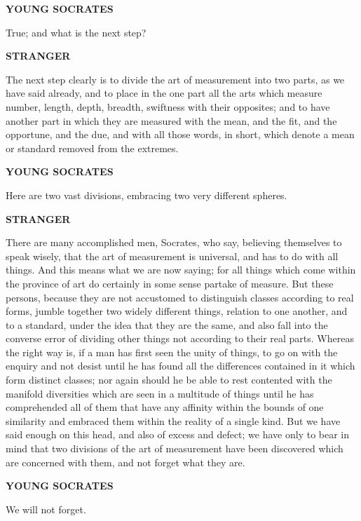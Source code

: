 \documentclass[11pt,letter]{article}
\begin{document}
\par \textbf{YOUNG SOCRATES}
\par   True; and what is the next step?

\par \textbf{STRANGER}
\par   The next step clearly is to divide the art of measurement into two parts, as we have said already, and to place in the one part all the arts which measure number, length, depth, breadth, swiftness with their opposites; and to have another part in which they are measured with the mean, and the fit, and the opportune, and the due, and with all those words, in short, which denote a mean or standard removed from the extremes.

\par \textbf{YOUNG SOCRATES}
\par   Here are two vast divisions, embracing two very different spheres.

\par \textbf{STRANGER}
\par   There are many accomplished men, Socrates, who say, believing themselves to speak wisely, that the art of measurement is universal, and has to do with all things. And this means what we are now saying; for all things which come within the province of art do certainly in some sense partake of measure. But these persons, because they are not accustomed to distinguish classes according to real forms, jumble together two widely different things, relation to one another, and to a standard, under the idea that they are the same, and also fall into the converse error of dividing other things not according to their real parts. Whereas the right way is, if a man has first seen the unity of things, to go on with the enquiry and not desist until he has found all the differences contained in it which form distinct classes; nor again should he be able to rest contented with the manifold diversities which are seen in a multitude of things until he has comprehended all of them that have any affinity within the bounds of one similarity and embraced them within the reality of a single kind. But we have said enough on this head, and also of excess and defect; we have only to bear in mind that two divisions of the art of measurement have been discovered which are concerned with them, and not forget what they are.

\par \textbf{YOUNG SOCRATES}
\par   We will not forget.
\end{document}
